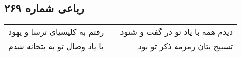\begin{center}
\section*{رباعی شماره ۲۶۹}
\label{sec:sh269}
\begin{longtable}{l p{0.5cm} r}
رفتم به کلیسیای ترسا و یهود
&&
دیدم همه با یاد تو در گفت و شنود
\\
با یاد وصال تو به بتخانه شدم
&&
تسبیح بتان زمزمه ذکر تو بود
\\
\end{longtable}
\end{center}
